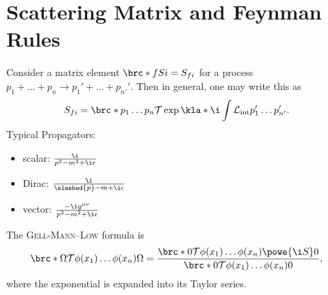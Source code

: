 \documentclass[english, parskip=full]{scrbook}
\begin{document}
\section{Scattering Matrix and Feynman Rules}
Consider a matrix element $\brc*{f}{S}{i}=S_{fi}$ for a process $p_1 + \dots + p_n\rightarrow p_1' + \dots + p_{n'}'$.
Then in general, one may write this as
\begin{align}
S_{fi} &= \brc*{p_1\dots p_n}{\mathcal{T}\exp\kla*{\i \int \mathcal{L}_\text{int}}}{p_1'\dots p_{n'}'}.
\end{align}
Typical Propagators:
\begin{itemize}
\item scalar: $\frac{\i}{p^2 - m^2 + \i \epsilon}$
\item Dirac: $\frac{\i}{\slashed{p} - m + \i\epsilon}$
\item vector: $\frac{-\i g^{\mu\nu}}{p^2-m^2+\i\epsilon}$
\end{itemize}
The \textsc{Gell-Mann--Low} formula is
\begin{align}
\brc*{\Omega}{\mathcal{T} \phi(x_1)\dots \phi(x_n)}{\Omega} &= \frac{\brc*{0}{\mathcal{T}\phi(x_1) \dots \phi(x_n)\powe{\i S}}{0}}{\brc*{0}{\mathcal{T}\phi(x_1) \dots \phi(x_n)}{0}},
\end{align}
where the exponential is expanded into its Taylor series.
\end{document}
